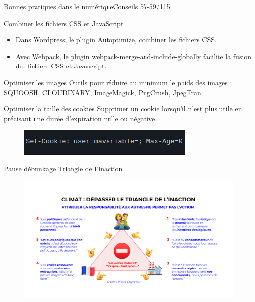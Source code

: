 \begin{frame}{Bonnes pratiques dans le numérique}{Conseils 57-59/115}
\begin{block}{Combiner les fichiers CSS et JavaScript}
\begin{itemize}
    \item Dans Wordpress, le plugin Autoptimize, combiner les fichiers CSS.
    \item Avec Webpack, le plugin webpack-merge-and-include-globally facilite la fusion des fichiers CSS et Javascript.
\end{itemize}
\end{block}

\begin{block}{Optimiser les images}
Outils pour réduire au minimum le poids des images :
    SQUOOSH,
    CLOUDINARY,
    ImageMagick,
    PngCrush,
    JpegTran
\end{block}

\begin{block}{Optimiser la taille des cookies}
Supprimer un cookie lorsqu’il n’est plus utile en précisant une durée d’expiration nulle ou négative.


\begin{figure}
    \centering
    \includegraphics[scale=0.5]{chapitre2/wdd5/fig/c5.png}
\end{figure}
\end{block}
\end{frame}


\begin{frame}{Pause débunkage }{Triangle de l'inaction}
\begin{figure}
    \centering
    \includegraphics[scale=0.35]{Feathergraphics/[Outils Méthodo] Triangle de l'inaction.png}
\end{figure}
\end{frame}